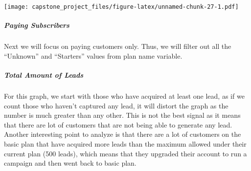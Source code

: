 \documentclass[]{article}
\newenvironment{Shaded}{\begin{snugshade}}{\end{snugshade}}
\newcommand{\KeywordTok}[1]{\textcolor[rgb]{0.13,0.29,0.53}{\textbf{#1}}}
\newcommand{\DataTypeTok}[1]{\textcolor[rgb]{0.13,0.29,0.53}{#1}}
\newcommand{\StringTok}[1]{\textcolor[rgb]{0.31,0.60,0.02}{#1}}
\newcommand{\OperatorTok}[1]{\textcolor[rgb]{0.81,0.36,0.00}{\textbf{#1}}}
\newcommand{\NormalTok}[1]{#1}
\let\oldsubparagraph\subparagraph
\renewcommand{\subparagraph}[1]{\oldsubparagraph{#1}\mbox{}}
\begin{document}
\begin{Shaded}
\end{Shaded}

\texttt{[image: capstone\_project\_files/figure-latex/unnamed-chunk-27-1.pdf]}

\subparagraph{Paying Subscribers}\label{paying-subscribers}

Next we will focus on paying customers only. Thus, we will filter out
all the ``Unknown'' and ``Starters'' values from plan name variable.

\begin{Shaded}
\end{Shaded}

\subparagraph{Total Amount of Leads}\label{total-amount-of-leads}

For this graph, we start with those who have acquired at least one lead,
as if we count those who haven't captured any lead, it will distort the
graph as the number is much greater than any other. This is not the best
signal as it means that there are lot of customers that are not being
able to generate any lead. Another interesting point to analyze is that
there are a lot of customers on the basic plan that have acquired more
leads than the maximum allowed under their current plan (500 leads),
which means that they upgraded their account to run a campaign and then
went back to basic plan.
\end{document}
